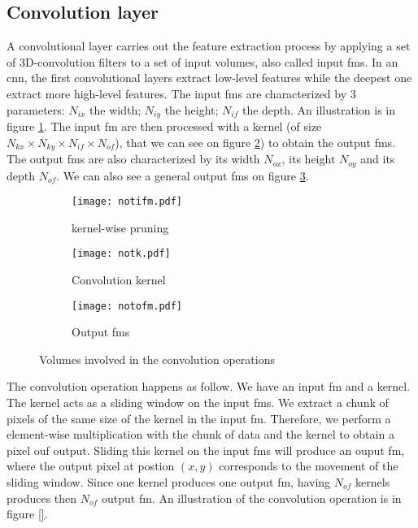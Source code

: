 \subsection{Convolution layer} \label{subs:2dconv}
A convolutional layer carries out the feature extraction process by applying a set of 3D-convolution filters to a set of input volumes, also called input \acrfull{fm}s. In an \acrshort{cnn}, the first convolutional layers extract low-level features while the deepest one extract more high-level features. The input \acrfull{fm}s are characterized by 3 parameters: \textbf{$N_{ix}$} the width; \textbf{$N_{iy}$} the height; \textbf{$N_{if}$} the depth. An illustration is in figure \ref{fig:notation:ifm}.
The input \acrshort{fm} are then processed with a kernel (of size $N_{kx} \times N_{ky} \times N_{if} \times N_{of}$), that we can see on figure \ref{fig:notation:k}) to obtain the output \acrshort{fm}s. The output \acrshort{fm}s are also characterized by its width $N_{ox}$, its height $N_{oy}$ and its depth $N_{of}$. We can also see a general output \acrshort{fm}s on figure \ref{fig:notation:ofm}.
%
\begin{figure}
    \centering
    \begin{subfigure}{.32\textwidth}
    \centering
    \texttt{[image: notifm.pdf]}
    \caption{kernel-wise pruning}
    \label{fig:notation:ifm}
    \end{subfigure}
    \begin{subfigure}{.32\textwidth}
    \centering
    \texttt{[image: notk.pdf]}
    \caption{Convolution kernel}
    \label{fig:notation:k}
    \end{subfigure}
    \begin{subfigure}{.32\textwidth}
    \centering
    \texttt{[image: notofm.pdf]}
    \caption{Output \acrshort{fm}s}
    \label{fig:notation:ofm}
    \end{subfigure}
    \caption{Volumes involved in the convolution operations}
    \label{fig:notconv}
\end{figure}

The convolution operation happens as follow. We have an input \acrshort{fm} and a kernel. The kernel acts as a sliding window on the input \acrshort{fm}s. We extract a chunk of pixels of the same size of the kernel in the input \acrshort{fm}. Therefore, we perform a element-wise multiplication with the chunk of data and the kernel to obtain a pixel ouf output. Sliding this kernel on the input \acrshort{fm}s will produce an ouput \acrshort{fm}, where the output pixel at postion $(x, y)$ corresponds to the movement of the sliding window. Since one kernel produces one output \acrshort{fm}, having $N_{of}$ kernels produces then $N_{of}$ output \acrshort{fm}. An illustration of the convolution operation is in figure \ref{}.

